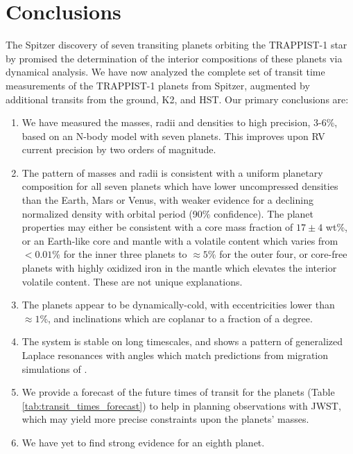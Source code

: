 \documentclass[twocolumn]{aastex63}
\begin{document}
\section{Conclusions} \label{sec:conclusions}

The Spitzer discovery of seven transiting planets orbiting the TRAPPIST-1 star by \citet{Gillon2017} promised the determination of the interior compositions of these planets via dynamical analysis.
We have now analyzed the complete set of transit time measurements
of the TRAPPIST-1 planets from  Spitzer, augmented by
additional transits from the ground, K2, and HST.  Our primary conclusions
are:

\begin{enumerate}
    \item  We have measured the masses, radii and densities to high precision, 3-6\%, based on an N-body model with seven planets.  This improves upon RV current precision by two orders of magnitude.
    \item  The pattern of masses and radii is consistent with a uniform planetary composition for all seven planets
          which have lower uncompressed densities than the Earth, Mars or Venus, with weaker evidence for a declining normalized density with orbital period (90\% confidence). The planet properties may either be consistent with
          a core mass fraction of $17{\pm}4$ wt\%, or an Earth-like core and mantle with a volatile
          content which varies from ${<}0.01$\% for the inner three planets to ${\approx} 5$\%
          for the outer four, or core-free planets with highly oxidized iron in the mantle which elevates the interior volatile content.  These are not unique explanations.
    \item  The planets appear to be dynamically-cold, with eccentricities lower than
          ${\approx }1$\%, and inclinations which are coplanar to a fraction of a degree.
    \item The system is stable on long timescales, and shows a pattern of generalized Laplace resonances with angles which match predictions from migration simulations of \citet{Mah2018}.
    \item We provide a forecast of the future times of transit for the planets (Table \ref{tab:transit_times_forecast}) to help in planning observations with JWST, which may yield more precise constraints upon the planets' masses.
    \item We have yet to find strong evidence for an eighth planet.
\end{enumerate}
\end{document}
